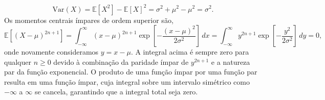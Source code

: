 \begin{enumerate}[label=\textbf{3.\arabic*.}]
\begin{equation*}
		\text{Var}(X) = \mathbb{E}[X^2] - \mathbb{E}[X]^2 = \sigma^2 + \mu^2 - \mu^2 = \sigma^2.
	\end{equation*}
	Os momentos centrais ímpares de ordem superior são,
	\begin{equation*}
		\mathbb{E}[(X - \mu)^{2n + 1}] = \int_{-\infty}^{\infty} (x - \mu)^{2n + 1} \exp\left[-\dfrac{(x-\mu)^2}{2\sigma^2}\right]\, dx = \int_{-\infty}^{\infty} y^{2n + 1} \exp\left[-\dfrac{y^2}{2\sigma^2}\right]\, dy = 0,
	\end{equation*}	
	onde novamente consideramos $y = x - \mu$. A integral acima é sempre zero para qualquer $n \geq 0$ devido à combinação da paridade ímpar de $y^{2n+1}$ e a natureza par da função exponencial. O produto de uma função ímpar por uma função par resulta em uma função ímpar, cuja integral sobre um intervalo simétrico como $-\infty$ a $\infty$ se cancela, garantindo que a integral total seja zero.
	

\end{enumerate}
